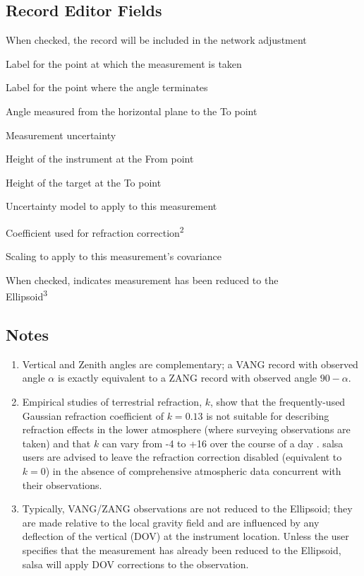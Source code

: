 \subsection*{Record Editor Fields}

\begin{description}[leftmargin=!,labelwidth=\widthof{\bfseries Refract Coeff:}]
\item[Enabled:] When checked, the record will be included in the network adjustment
\item[From:] Label for the point at which the measurement is taken
\item[To:] Label for the point where the angle terminates
\item[Angle:] Angle measured from the horizontal plane to the To point
\item[Sigma:] Measurement uncertainty
\item[Height From:] Height of the instrument at the From point
\item[Height To:] Height of the target at the To point
\item[Uncertainty:] Uncertainty model to apply to this measurement
\item[Refract Coeff:] Coefficient used for refraction correction\textsuperscript{2}
\item[Scaling:] Scaling to apply to this measurement's covariance
\item[Reduced:] When checked, indicates measurement has been reduced to the \\Ellipsoid\textsuperscript{3}
\end{description}

\subsection*{Notes}
\begin{enumerate}
\item Vertical and Zenith angles are complementary; a VANG record with observed angle $\alpha$ is exactly equivalent to a ZANG record with observed angle $90 - \alpha$.
\item Empirical studies of terrestrial refraction, $k$, show that the frequently-used Gaussian refraction coefficient of $k=0.13$ is not suitable for describing refraction effects in the lower atmosphere (where surveying observations are taken) and that $k$ can vary from -4 to +16 over the course of a day \cite{Hirt}.  \textsf{salsa} users are advised to leave the refraction correction disabled (equivalent to $k=0$) in the absence of comprehensive atmospheric data concurrent with their observations.
\item Typically, VANG/ZANG observations are not reduced to the Ellipsoid; they are made relative to the local gravity field and are influenced by any deflection of the vertical (DOV) at the instrument location.  Unless the user specifies that the measurement has already been reduced to the Ellipsoid, \textsf{salsa} will apply DOV corrections to the observation.
\end{enumerate}


